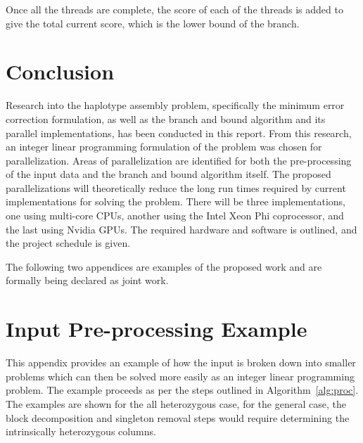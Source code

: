 \documentclass[10pt,twocolumn]{article}
\begin{document}
Once all the threads are complete, the score of each of the threads is added to give the total current score,
which is the lower bound of the branch.

\section{Conclusion} \label{sec:conc}

Research into the haplotype assembly problem, specifically the minimum error correction formulation, as well
as the branch and bound algorithm and its parallel implementations, has been conducted in this report. From
this research, an integer linear programming formulation of the problem was chosen for parallelization.
Areas of parallelization are identified for both the pre-processing of the input data and the branch and bound
algorithm itself. The proposed parallelizations will theoretically reduce the long run times required by
current implementations for solving the problem. There will be three implementations, one using multi-core CPUs, 
another using the Intel Xeon
Phi coprocessor, and the last using Nvidia GPUs. The required hardware and software is outlined, and the 
project schedule is given. 




\clearpage 

\appendix

The following two appendices are examples of the proposed work and are formally being declared as joint work.

\section{Input Pre-processing Example} \label{app:inpre}

This appendix provides an example of how the input is broken down into smaller problems which can then be 
solved more easily as an integer linear programming problem. The example proceeds as per the steps outlined in
Algorithm~\ref{alg:proc}. The examples are shown for the all heterozygous case, for the general case, the
block decomposition and singleton removal steps would require determining the intrinsically heterozygous
columns.
\end{document}
